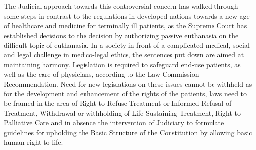 \begin{multicols}{2}
\noi
The Judicial approach towards this controversial concern has walked through some steps in
contrast to the regulations in developed nations towards a new age of healthcare and medicine
for terminally ill patients, as the Supreme Court has established decisions to the decision by
authorizing passive euthanasia on the difficult topic of euthanasia. In a society in front of a
complicated medical, social and legal challenge in medico-legal ethics, the sentences put
down are aimed at maintaining harmony. Legislation is required to safeguard end-use
patients, as well as the care of physicians, according to the Law Commission
Recommendation. Need for new legislations on these issues cannot be withheld as for the
development and enhancement of the rights of the patients, laws need to be framed in the area
of Right to Refuse Treatment or Informed Refusal of Treatment, Withdrawal or withholding
of Life Sustaining Treatment, Right to Palliative Care and in absence the intervention of
Judiciary to formulate guidelines for upholding the Basic Structure of the Constitution by
allowing basic human right to life.

\end{multicols}
